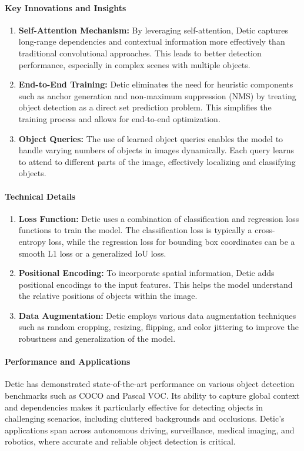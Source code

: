 \documentclass[12pt]{article}
\begin{document}
\paragraph{Key Innovations and Insights}
\begin{enumerate}
    \item \textbf{Self-Attention Mechanism:} By leveraging self-attention, Detic captures long-range dependencies and contextual information more effectively than traditional convolutional approaches. This leads to better detection performance, especially in complex scenes with multiple objects.
    \item \textbf{End-to-End Training:} Detic eliminates the need for heuristic components such as anchor generation and non-maximum suppression (NMS) by treating object detection as a direct set prediction problem. This simplifies the training process and allows for end-to-end optimization.
    \item \textbf{Object Queries:} The use of learned object queries enables the model to handle varying numbers of objects in images dynamically. Each query learns to attend to different parts of the image, effectively localizing and classifying objects.
\end{enumerate}

\paragraph{Technical Details}
\begin{enumerate}
    \item \textbf{Loss Function:} Detic uses a combination of classification and regression loss functions to train the model. The classification loss is typically a cross-entropy loss, while the regression loss for bounding box coordinates can be a smooth L1 loss or a generalized IoU loss.
    \item \textbf{Positional Encoding:} To incorporate spatial information, Detic adds positional encodings to the input features. This helps the model understand the relative positions of objects within the image.
    \item \textbf{Data Augmentation:} Detic employs various data augmentation techniques such as random cropping, resizing, flipping, and color jittering to improve the robustness and generalization of the model.
\end{enumerate}

\paragraph{Performance and Applications}
Detic has demonstrated state-of-the-art performance on various object detection benchmarks such as COCO and Pascal VOC. Its ability to capture global context and dependencies makes it particularly effective for detecting objects in challenging scenarios, including cluttered backgrounds and occlusions. Detic's applications span across autonomous driving, surveillance, medical imaging, and robotics, where accurate and reliable object detection is critical.
\end{document}
